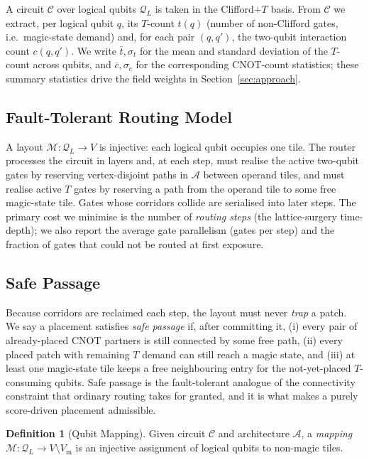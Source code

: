 \documentclass[10pt,conference]{IEEEtran}
\theoremstyle{definition}
\newtheorem{definition}{Definition}
\theoremstyle{remark}
\newcommand{\A}{\mathcal{A}}            %
\newcommand{\C}{\mathcal{C}}            %
\newcommand{\Q}{\mathcal{Q}}            %
\newcommand{\M}{\mathcal{M}}            %
\begin{document}
A circuit $\C$ over logical qubits $\Q_L$ is taken in the Clifford$+T$ basis.
From $\C$ we extract, per logical qubit $q$, its $T$-count $t(q)$ (number of
non-Clifford gates, i.e.\ magic-state demand) and, for each pair $(q,q')$, the
two-qubit interaction count $c(q,q')$. We write $\bar t,\sigma_t$ for the mean
and standard deviation of the $T$-count across qubits, and $\bar c,\sigma_c$
for the corresponding CNOT-count statistics; these summary statistics drive the
field weights in Section~\ref{sec:approach}.

\subsection{Fault-Tolerant Routing Model}

A layout $\M:\Q_L\to V$ is injective: each logical qubit occupies one tile. The
router processes the circuit in layers and, at each step, must realise the
active two-qubit gates by reserving vertex-disjoint paths in $\A$ between
operand tiles, and must realise active $T$ gates by reserving a path from the
operand tile to some free magic-state tile. Gates whose corridors collide are
serialised into later steps. The primary cost we minimise is the number of
\emph{routing steps} (the lattice-surgery time-depth); we also report the
average gate parallelism (gates per step) and the fraction of gates that could
not be routed at first exposure.

\subsection{Safe Passage}

Because corridors are reclaimed each step, the layout must never \emph{trap} a
patch. We say a placement satisfies \emph{safe passage} if, after committing it,
(i) every pair of already-placed CNOT partners is still connected by some free
path, (ii) every placed patch with remaining $T$ demand can still reach a magic
state, and (iii) at least one magic-state tile keeps a free neighbouring entry
for the not-yet-placed $T$-consuming qubits. Safe passage is the
fault-tolerant analogue of the connectivity constraint that ordinary routing
takes for granted, and it is what makes a purely score-driven placement
admissible.

\begin{definition}[Qubit Mapping]
    Given circuit $\C$ and architecture $\A$, a \emph{mapping}
    $\M : \Q_L \to V\setminus V_{\mathrm m}$ is an injective assignment of
    logical qubits to non-magic tiles.
\end{definition}
\end{document}
